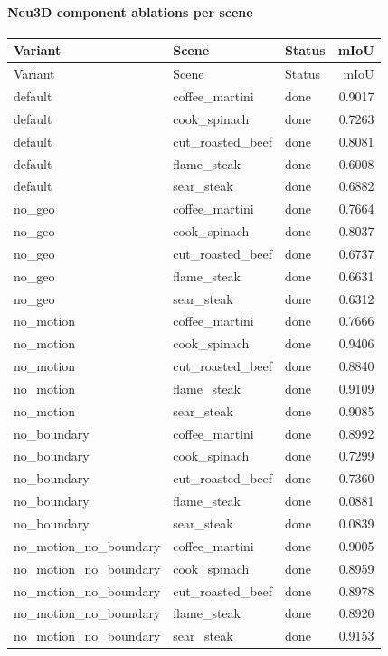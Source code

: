 \documentclass[10pt]{article}
\begin{document}
\paragraph{Neu3D component ablations per scene}
\small
\begin{longtable}{lllr}
\toprule
Variant & Scene & Status & mIoU \\
\midrule
\endfirsthead
\toprule
Variant & Scene & Status & mIoU \\
\midrule
\endhead
default & coffee\_martini & done & 0.9017 \\
default & cook\_spinach & done & 0.7263 \\
default & cut\_roasted\_beef & done & 0.8081 \\
default & flame\_steak & done & 0.6008 \\
default & sear\_steak & done & 0.6882 \\
no\_geo & coffee\_martini & done & 0.7664 \\
no\_geo & cook\_spinach & done & 0.8037 \\
no\_geo & cut\_roasted\_beef & done & 0.6737 \\
no\_geo & flame\_steak & done & 0.6631 \\
no\_geo & sear\_steak & done & 0.6312 \\
no\_motion & coffee\_martini & done & 0.7666 \\
no\_motion & cook\_spinach & done & 0.9406 \\
no\_motion & cut\_roasted\_beef & done & 0.8840 \\
no\_motion & flame\_steak & done & 0.9109 \\
no\_motion & sear\_steak & done & 0.9085 \\
no\_boundary & coffee\_martini & done & 0.8992 \\
no\_boundary & cook\_spinach & done & 0.7299 \\
no\_boundary & cut\_roasted\_beef & done & 0.7360 \\
no\_boundary & flame\_steak & done & 0.0881 \\
no\_boundary & sear\_steak & done & 0.0839 \\
no\_motion\_no\_boundary & coffee\_martini & done & 0.9005 \\
no\_motion\_no\_boundary & cook\_spinach & done & 0.8959 \\
no\_motion\_no\_boundary & cut\_roasted\_beef & done & 0.8978 \\
no\_motion\_no\_boundary & flame\_steak & done & 0.8920 \\
no\_motion\_no\_boundary & sear\_steak & done & 0.9153 \\
\bottomrule
\end{longtable}
\normalsize
\end{document}
